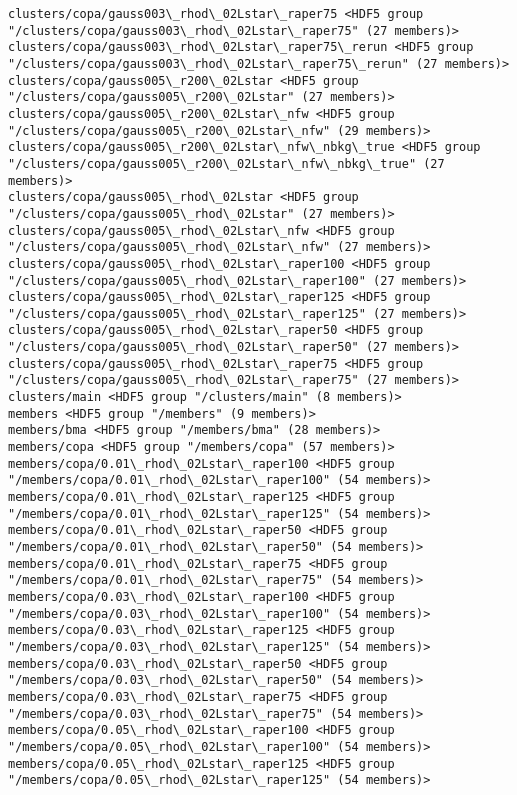 \documentclass[11pt]{article}
\begin{document}
\begin{Verbatim}[commandchars=\\\{\}]
clusters/copa/gauss003\_rhod\_02Lstar\_raper75 <HDF5 group "/clusters/copa/gauss003\_rhod\_02Lstar\_raper75" (27 members)>
clusters/copa/gauss003\_rhod\_02Lstar\_raper75\_rerun <HDF5 group "/clusters/copa/gauss003\_rhod\_02Lstar\_raper75\_rerun" (27 members)>
clusters/copa/gauss005\_r200\_02Lstar <HDF5 group "/clusters/copa/gauss005\_r200\_02Lstar" (27 members)>
clusters/copa/gauss005\_r200\_02Lstar\_nfw <HDF5 group "/clusters/copa/gauss005\_r200\_02Lstar\_nfw" (29 members)>
clusters/copa/gauss005\_r200\_02Lstar\_nfw\_nbkg\_true <HDF5 group "/clusters/copa/gauss005\_r200\_02Lstar\_nfw\_nbkg\_true" (27 members)>
clusters/copa/gauss005\_rhod\_02Lstar <HDF5 group "/clusters/copa/gauss005\_rhod\_02Lstar" (27 members)>
clusters/copa/gauss005\_rhod\_02Lstar\_nfw <HDF5 group "/clusters/copa/gauss005\_rhod\_02Lstar\_nfw" (27 members)>
clusters/copa/gauss005\_rhod\_02Lstar\_raper100 <HDF5 group "/clusters/copa/gauss005\_rhod\_02Lstar\_raper100" (27 members)>
clusters/copa/gauss005\_rhod\_02Lstar\_raper125 <HDF5 group "/clusters/copa/gauss005\_rhod\_02Lstar\_raper125" (27 members)>
clusters/copa/gauss005\_rhod\_02Lstar\_raper50 <HDF5 group "/clusters/copa/gauss005\_rhod\_02Lstar\_raper50" (27 members)>
clusters/copa/gauss005\_rhod\_02Lstar\_raper75 <HDF5 group "/clusters/copa/gauss005\_rhod\_02Lstar\_raper75" (27 members)>
clusters/main <HDF5 group "/clusters/main" (8 members)>
members <HDF5 group "/members" (9 members)>
members/bma <HDF5 group "/members/bma" (28 members)>
members/copa <HDF5 group "/members/copa" (57 members)>
members/copa/0.01\_rhod\_02Lstar\_raper100 <HDF5 group "/members/copa/0.01\_rhod\_02Lstar\_raper100" (54 members)>
members/copa/0.01\_rhod\_02Lstar\_raper125 <HDF5 group "/members/copa/0.01\_rhod\_02Lstar\_raper125" (54 members)>
members/copa/0.01\_rhod\_02Lstar\_raper50 <HDF5 group "/members/copa/0.01\_rhod\_02Lstar\_raper50" (54 members)>
members/copa/0.01\_rhod\_02Lstar\_raper75 <HDF5 group "/members/copa/0.01\_rhod\_02Lstar\_raper75" (54 members)>
members/copa/0.03\_rhod\_02Lstar\_raper100 <HDF5 group "/members/copa/0.03\_rhod\_02Lstar\_raper100" (54 members)>
members/copa/0.03\_rhod\_02Lstar\_raper125 <HDF5 group "/members/copa/0.03\_rhod\_02Lstar\_raper125" (54 members)>
members/copa/0.03\_rhod\_02Lstar\_raper50 <HDF5 group "/members/copa/0.03\_rhod\_02Lstar\_raper50" (54 members)>
members/copa/0.03\_rhod\_02Lstar\_raper75 <HDF5 group "/members/copa/0.03\_rhod\_02Lstar\_raper75" (54 members)>
members/copa/0.05\_rhod\_02Lstar\_raper100 <HDF5 group "/members/copa/0.05\_rhod\_02Lstar\_raper100" (54 members)>
members/copa/0.05\_rhod\_02Lstar\_raper125 <HDF5 group "/members/copa/0.05\_rhod\_02Lstar\_raper125" (54 members)>

\end{Verbatim}
\end{document}
